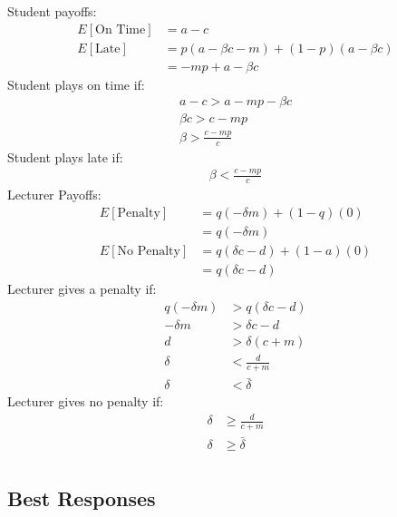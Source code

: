 \documentclass[11pt,preprint, authoryear]{elsarticle}
\numberwithin{equation}{section}
\numberwithin{figure}{section}
\numberwithin{table}{section}
\begin{document}
Student payoffs: \begin{align*}
E[\text{On Time}]&= a- c \\
E[\text{Late}]&=  p(a-\beta c-m) +(1-p)(a-\beta c) \\
&=-m p+a-\beta c
\end{align*} Student plays on time if: \begin{align*}
a-c>a-m p-\beta c \\
\beta c>c-m p \\
\beta>\frac{c-m p}{c}
\end{align*} Student plays late if: \begin{align*}
\beta<\frac{c-m p}{c}
\end{align*} Lecturer Payoffs: \begin{align*}
E[\text{Penalty}]&=q(-\delta m)+(1-q)(0) \\
&=q(-\delta m) \\
E[\text{No Penalty}] &=q(\delta c-d)+(1-a)(0) \\
&=q(\delta c-d)
\end{align*} Lecturer gives a penalty if: \begin{align*}
q(-\delta m)&>q(\delta c-d) \\
-\delta m&>\delta c-d \\
d&>\delta(c+m) \\
\delta&<\frac{d}{c+m} \\
\delta &<\bar{\delta}
\end{align*} Lecturer gives no penalty if: \begin{align*}
\delta &\geq \frac{d}{c+m} \\
\delta &\geq \bar{\delta} \\
\end{align*}

\hypertarget{best-responses}{%
\subsection*{\texorpdfstring{Best Responses
\label{br}}{Best Responses }}\label{best-responses}}
\end{document}
